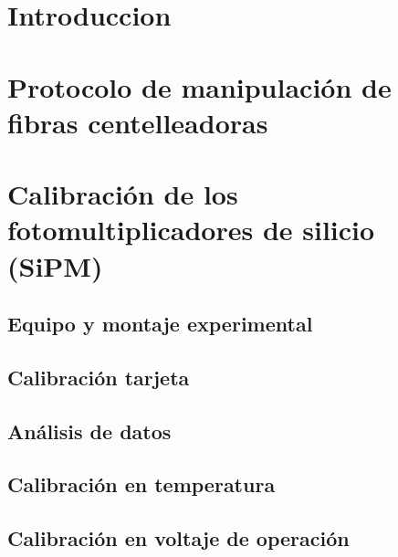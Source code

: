 \documentclass[11pt,a4paper]{article}
\begin{document}


\tableofcontents
\newpage


\section{Introduccion}  \label{sec:Introduccion}


\newpage
\section{Protocolo de manipulación de fibras centelleadoras} \label{sec:Fibras}


\newpage
\section{Calibración de los fotomultiplicadores de silicio (SiPM)} \label{sec:SiPM}

	\subsection{Equipo y montaje experimental}\label{sec:Equipo}
	
	
	\subsection{Calibración tarjeta}\label{sec:Tarjeta}
	
	
	\subsection{Análisis de datos}\label{sec:Analisis}
	
	
	\subsection{Calibración en temperatura}\label{sec:Temperatura}
	

	\subsection{Calibración en voltaje de operación}\label{sec:Voltaje}
	
	
\end{document}
